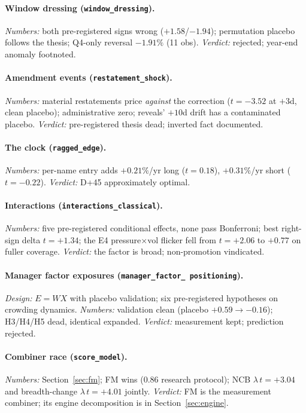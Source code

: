 \paragraph{Window dressing (\texttt{window\_dressing}).}
\emph{Numbers:} both pre-registered signs wrong ($+1.58$/$-1.94$);
permutation placebo follows the thesis; Q4-only reversal $-1.91\%$
(11 obs). \emph{Verdict:} rejected; year-end anomaly footnoted.

\paragraph{Amendment events (\texttt{restatement\_shock}).}
\emph{Numbers:} material restatements price \emph{against} the
correction ($t=-3.52$ at $+3$d, clean placebo); administrative zero;
reveals' $+10$d drift has a contaminated placebo. \emph{Verdict:}
pre-registered thesis dead; inverted fact documented.

\paragraph{The clock (\texttt{ragged\_edge}).}
\emph{Numbers:} per-name entry adds $+0.21\%$/yr long ($t=0.18$),
$+0.31\%$/yr short ($t=-0.22$). \emph{Verdict:} D+45 approximately
optimal.

\paragraph{Interactions (\texttt{interactions\_classical}).}
\emph{Numbers:} five pre-registered conditional effects, none pass
Bonferroni; best right-sign delta $t=+1.34$; the E4
pressure$\times$vol flicker fell from $t=+2.06$ to $+0.77$ on fuller
coverage. \emph{Verdict:} the factor is broad; non-promotion
vindicated.

\paragraph{Manager factor exposures (\texttt{manager\_factor\_%
positioning}).}
\emph{Design:} $E=WX$ with placebo validation; six pre-registered
hypotheses on crowding dynamics. \emph{Numbers:} validation clean
(placebo $+0.59\to-0.16$); H3/H4/H5 dead, identical expanded.
\emph{Verdict:} measurement kept; prediction rejected.

\paragraph{Combiner race (\texttt{score\_model}).}
\emph{Numbers:} Section~\ref{sec:fm}; FM wins (0.86 research
protocol); NCB $\lambda\,t=+3.04$ and breadth-change
$\lambda\,t=+4.01$ jointly. \emph{Verdict:} FM is the measurement
combiner; its engine decomposition is in Section~\ref{sec:engine}.

